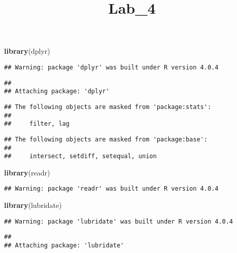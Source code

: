 \documentclass[
]{article}
\title{Lab\_4}
\author{}
\date{\vspace{-2.5em}}
\newenvironment{Shaded}{\begin{snugshade}}{\end{snugshade}}
\newcommand{\KeywordTok}[1]{\textcolor[rgb]{0.13,0.29,0.53}{\textbf{#1}}}
\newcommand{\NormalTok}[1]{#1}
\begin{document}
\maketitle

\begin{Shaded}
\begin{Highlighting}[]
\KeywordTok{library}\NormalTok{(dplyr)}
\end{Highlighting}
\end{Shaded}

\begin{verbatim}
## Warning: package 'dplyr' was built under R version 4.0.4
\end{verbatim}

\begin{verbatim}
## 
## Attaching package: 'dplyr'
\end{verbatim}

\begin{verbatim}
## The following objects are masked from 'package:stats':
## 
##     filter, lag
\end{verbatim}

\begin{verbatim}
## The following objects are masked from 'package:base':
## 
##     intersect, setdiff, setequal, union
\end{verbatim}

\begin{Shaded}
\begin{Highlighting}[]
\KeywordTok{library}\NormalTok{(readr)}
\end{Highlighting}
\end{Shaded}

\begin{verbatim}
## Warning: package 'readr' was built under R version 4.0.4
\end{verbatim}

\begin{Shaded}
\begin{Highlighting}[]
\KeywordTok{library}\NormalTok{(lubridate)}
\end{Highlighting}
\end{Shaded}

\begin{verbatim}
## Warning: package 'lubridate' was built under R version 4.0.4
\end{verbatim}

\begin{verbatim}
## 
## Attaching package: 'lubridate'
\end{verbatim}
\end{document}
